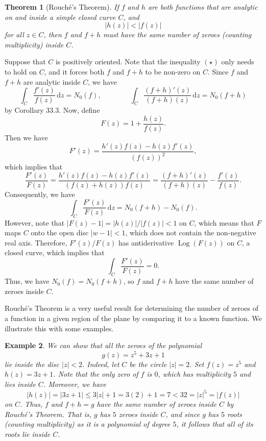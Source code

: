 \documentclass[10pt]{article}
\makeatletter
\newcommand{\dd}{\,\mathrm{d}}
\DeclareMathOperator{\Log}{Log}
\theoremstyle{newstyle}
\newtheorem{thm}{Theorem}[section]
\newtheorem{exmp}[thm]{Example}
\newenvironment{pf}[1][\proofname]{\par
  \pushQED{\qed}%
  \normalfont \topsep0\p@\relax
  \trivlist
  \item[\hskip\labelsep\scshape
  #1\@addpunct{.}]\ignorespaces
}{%
  \popQED\endtrivlist\@endpefalse
}
\makeatother
\begin{document}
\begin{thm}[Rouch\'e's Theorem]
If $f$ and $h$ are both functions that are analytic on and inside a simple closed curve $C$, and 
\[ |h(z)| < |f(z)| \tag{$\star$} \]
for all $z \in C$, then $f$ and $f+h$ must have the same number of zeroes (counting multiplicity) inside 
$C$. 
\end{thm}
\begin{pf}
Suppose that $C$ is positively oriented. Note that the inequality $(\star)$ only needs to hold on $C$,
and it forces both $f$ and $f+h$ to be non-zero on $C$. Since $f$ and $f+h$ are analytic inside $C$, we have 
\[ \int_C \frac{f'(z)}{f(z)}\dd z = N_0(f), \qquad\qquad \int_C \frac{(f+h)'(z)}{(f+h)(z)}\dd z = 
N_0(f+h) \]
by Corollary 33.3. Now, define
\[ F(z) = 1 + \frac{h(z)}{f(z)}. \]
Then we have 
\[ F'(z) = \frac{h'(z)f(z) - h(z)f'(z)}{(f(z))^2}, \]
which implies that 
\[ \frac{F'(z)}{F(z)} = \frac{h'(z)f(z) - h(z)f'(z)}{(f(z) + h(z))f(z)} = \frac{(f+h)'(z)}{(f+h)(z)}
- \frac{f'(z)}{f(z)}. \]
Consequently, we have 
\[ \int_C \frac{F'(z)}{F(z)}\dd z = N_0(f+h) - N_0(f). \]
However, note that $|F(z) - 1| = |h(z)|/|f(z)| < 1$ on $C$, which means that $F$ maps $C$ 
onto the open disc $|w-1| < 1$, which does not contain the non-negative real axis. Therefore, 
$F'(z)/F(z)$ has antiderivative $\Log(F(z))$ on $C$, a closed curve, which implies that 
\[ \int_C \frac{F'(z)}{F(z)} = 0. \]
Thus, we have $N_0(f) = N_0(f+h)$, so $f$ and $f+h$ have the same number of zeroes inside $C$. 
\end{pf}

Rouch\'e's Theorem is a very useful result for determining the number of zeroes of a function 
in a given region of the plane by comparing it to a known function. We illustrate this with some 
examples. 

\begin{exmp}
We can show that all the zeroes of the polynomial 
\[ g(z) = z^5 + 3z + 1 \]
lie inside the disc $|z| < 2$. Indeed, let $C$ be the circle $|z| = 2$. Set $f(z) = z^5$ and 
$h(z) = 3z+1$. Note that the only zero of $f$ is $0$, which has multiplicity $5$ and lies inside $C$. 
Moreover, we have 
\[ |h(z)| = |3z+1| \leq 3|z| + 1 = 3(2) + 1 = 7 < 32 = |z|^5 = |f(z)| \]
on $C$. Thus, $f$ and $f+h = g$ have the same number of zeroes inside $C$ by Rouch\'e's Theorem. 
That is, $g$ has $5$ zeroes inside $C$, and since $g$ has $5$ roots (counting multiplicity) 
as it is a polynomial of degree $5$, it follows that all of its roots lie inside $C$. 
\end{exmp}
\end{document}
